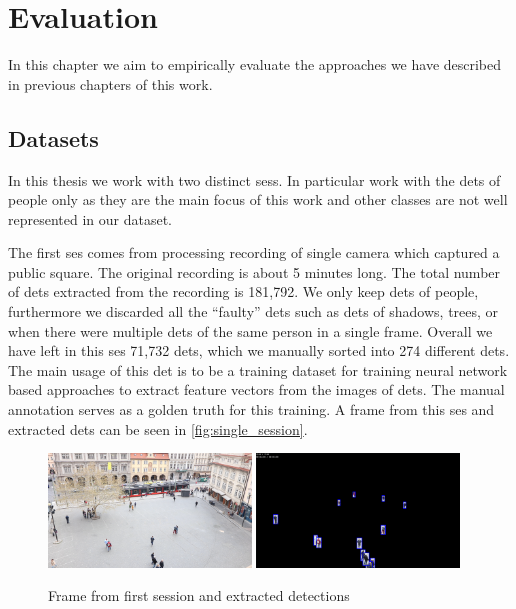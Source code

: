 \chapter{Evaluation}


\label{ch:evaluation}

In this chapter we aim to empirically evaluate the approaches we have described
in previous chapters of this work.

\section{Datasets}

\label{sec:datasets}

In this thesis we work with two distinct \glspl{ses}. In particular work with the \glspl{det} of people only as they are the main focus of this work and other classes are not well represented in our dataset.

The first \gls{ses} comes from processing recording of single camera which captured a public square. The original recording is about 5 minutes long. The total number of \glspl{det} extracted from the recording is 181,792. We only keep \glspl{det} of people, furthermore we discarded all the ``faulty'' \glspl{det} such as \glspl{det} of shadows, trees, or when there were multiple \glspl{det} of the same person in a single frame. Overall we have left in this \gls{ses} 71,732 \glspl{det}, which we manually sorted into 274 different \glspl{det}. The main usage of this \gls{det} is to be a training dataset for training neural network based approaches to extract feature vectors from the images of \glspl{det}. The manual annotation serves as a golden truth for this training. A frame from this \gls{ses} and extracted \glspl{det} can be seen in \autoref{fig:single_session}.

\begin{figure}
    \centering
    \includegraphics[width=0.48\textwidth]{img/frame_single_session_smaller.png}
    \includegraphics[width=0.48\textwidth]{img/frame_single_session_det_smaller.png}
    \caption{Frame from first session and extracted detections}
    \label{fig:single_session}
\end{figure}

